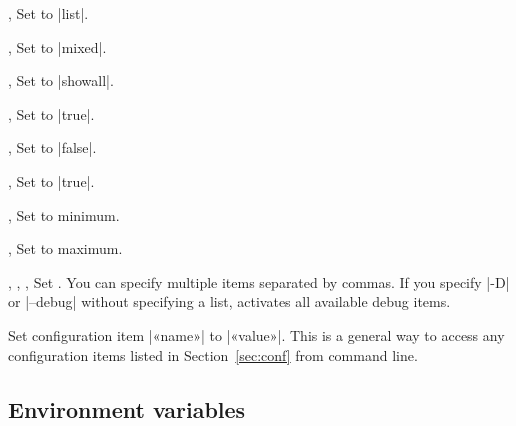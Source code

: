 \documentclass[draft]{texdoc-doc}
\begin{document}
\begin{clopt}{, }
Set  to |list|.
\end{clopt}

\begin{clopt}{, }
Set  to |mixed|.
\end{clopt}

\begin{clopt}{, }
Set  to |showall|.
\end{clopt}

\begin{clopt}{, }
Set  to |true|.
\end{clopt}

\begin{clopt}{, }
Set  to |false|.
\end{clopt}

\begin{clopt}{, }
Set  to |true|.
\end{clopt}

\begin{clopt}{, }
Set  to minimum.
\end{clopt}

\begin{clopt}{, }
Set  to maximum.
\end{clopt}

\begin{clopt}{%
  , ,
  , }
Set . You can specify multiple items separated by commas. If
you specify |-D| or |--debug| without specifying a list, activates all
available debug items.
\end{clopt}

\begin{clopt}{}
Set configuration item |«name»| to |«value»|. This is a general way to access
any configuration items listed in Section~\ref{sec:conf} from command line.
\end{clopt}

\subsection{Environment variables}
\label{sec:envvar}
\end{document}
